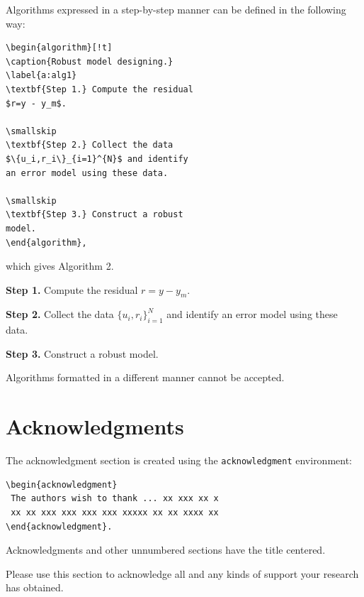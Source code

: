 \documentclass{amcs}
\begin{document}
Algorithms expressed in a step-by-step manner can be defined in the following way:
\begin{verbatim}
\begin{algorithm}[!t]
\caption{Robust model designing.}
\label{a:alg1}
\textbf{Step 1.} Compute the residual
$r=y - y_m$.

\smallskip
\textbf{Step 2.} Collect the data
$\{u_i,r_i\}_{i=1}^{N}$ and identify
an error model using these data.

\smallskip
\textbf{Step 3.} Construct a robust
model.
\end{algorithm},
\end{verbatim}
which gives Algorithm 2.
\begin{algorithm}[!t]
\caption{Robust model designing.}
\label{a:alg1}
\textbf{Step 1.} Compute the residual $r=y - y_m$.

\smallskip
\textbf{Step 2.} Collect the data $\{u_i,r_i\}_{i=1}^{N}$ and identify an error model using these data.

\smallskip
\textbf{Step 3.} Construct a robust model.
\end{algorithm}

Algorithms formatted in a different manner cannot be accepted.

\section{Acknowledgments}
The acknowledgment section is created using the \verb+acknowledgment+ environment:
{\small \begin{verbatim}
\begin{acknowledgment}
 The authors wish to thank ... xx xxx xx x
 xx xx xxx xxx xxx xxx xxxxx xx xx xxxx xx
\end{acknowledgment}.
\end{verbatim}}
Acknowledgments and other unnumbered sections have the title centered.

Please use this section to acknowledge all and any kinds of support your research has obtained.
\end{document}
